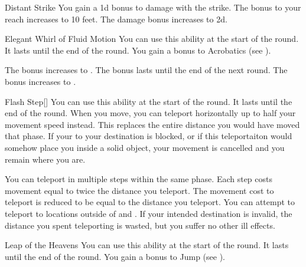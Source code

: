 {\begin{apability}{Distant Strike}
                \rankline
                 You gain a \plus1d bonus to damage with the strike.
                 The bonus to your reach increases to 10 feet. 
                 The damage bonus increases to \plus2d.
            \end{apability}

            \begin{apability}{Elegant Whirl of Fluid Motion}
                You can use this ability at the start of the round.
                It lasts until the end of the round.
                You gain a  bonus to Acrobatics (see ).

                \rankline
                 The bonus increases to .
                 The bonus lasts until the end of the next round.
                 The bonus increases to .
            \end{apability}

            \begin{apability}{Flash Step}[]
                You can use this ability at the start of the round.
                It lasts until the end of the round.
                When you move, you can teleport horizontally up to half your movement speed instead.
                This replaces the entire distance you would have moved that phase.
                If your  to your destination is blocked, or if this teleportaiton would somehow place you inside a solid object, your movement is cancelled and you remain where you are.

                \rankline
                 You can teleport in multiple steps within the same phase.
                Each step costs movement equal to twice the distance you teleport.
                 The movement cost to teleport is reduced to be equal to the distance you teleport.
                 You can attempt to teleport to locations outside of  and .
                If your intended destination is invalid, the distance you spent teleporting is wasted, but you suffer no other ill effects.
            \end{apability}

            \begin{apability}{Leap of the Heavens}
                You can use this ability at the start of the round.
                It lasts until the end of the round.
                You gain a  bonus to Jump (see ).


\end{apability}}
